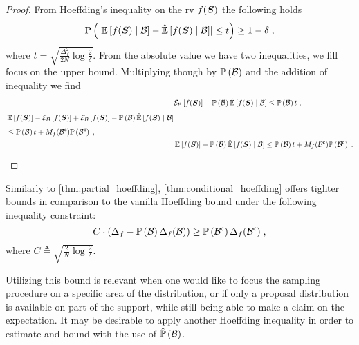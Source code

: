 \begin{proof}
	From Hoeffding's inequality on the \gls{rv} $f(\boldsymbol S)$ the following holds
	\begin{equation*}
		\mathrm{P}\left({\lvert\operatorname*{\mathbb{E}}\limits_{}\left[{f(\boldsymbol S)}\mid{\ensuremath{\mathcal B}}\right]-\operatorname*{\hat{\operatorname*{\mathbb{E}}}}\limits_{}\left[{f(\boldsymbol S)}\mid{\ensuremath{\mathcal B}}\right]\rvert\leq t}\right)\geq1-\delta\;,
	\end{equation*}
	where $t=\sqrt{\frac{\Delta_f^2}{2N}\log\frac{2}{\delta}}$. From the absolute value we have two inequalities, we fill focus on the upper bound.
	Multiplying though by $\mathbb{P}\left({\mathcal B}\right)$ and the addition of inequality  we find
	\begin{align*}
		& \mathcal{E}_{\mathcal B}\left[{f(\boldsymbol S)}\right]-\mathbb{P}\left({\mathcal B}\right)\operatorname*{\hat{\operatorname*{\mathbb{E}}}}\limits_{}\left[{f(\boldsymbol S)}\mid{\ensuremath{\mathcal B}}\right]\leq \mathbb{P}\left({\mathcal B}\right)t\;,\\
		\begin{split}
			& \operatorname*{\mathbb{E}}\limits_{}\left[{f(\boldsymbol S)}\right]-\mathcal{E}_{\mathcal B}\left[{f(\boldsymbol S)}\right]+\mathcal{E}_{\mathcal B}\left[{f(\boldsymbol S)}\right]-\mathbb{P}\left({\mathcal B}\right)\operatorname*{\hat{\operatorname*{\mathbb{E}}}}\limits_{}\left[{f(\boldsymbol S)}\mid{\ensuremath{\mathcal B}}\right] \\
			& \leq \mathbb{P}\left({\mathcal B}\right)t+M_f({\mathcal B}^{\mathsf{c}})\mathbb{P}\left({{\mathcal B}^{\mathsf{c}}}\right)\;,
		\end{split} \\
		& \operatorname*{\mathbb{E}}\limits_{}\left[{f(\boldsymbol S)}\right]-\mathbb{P}\left({\mathcal B}\right)\operatorname*{\hat{\operatorname*{\mathbb{E}}}}\limits_{}\left[{f(\boldsymbol S)}\mid{\ensuremath{\mathcal B}}\right]\leq\mathbb{P}\left({\mathcal B}\right)t+M_f({\mathcal B}^{\mathsf{c}})\mathbb{P}\left({{\mathcal B}^{\mathsf{c}}}\right)\;.
	\end{align*}
\end{proof}

\noindent Similarly to \cref{thm:partial_hoeffding}, \cref{thm:conditional_hoeffding} offers tighter bounds in comparison to the vanilla Hoeffding bound under the following inequality constraint:
\begin{equation}
	C\cdot\left(\Delta_f-\mathbb{P}\left({\mathcal B}\right)\Delta_f(\mathcal B)\right)\geq \mathbb{P}\left({{\mathcal B}^{\mathsf{c}}}\right)\Delta_f({\mathcal B}^{\mathsf{c}})\;,
\end{equation}
where $C\triangleq\sqrt{\frac{2}{N}\log\frac{2}{\delta}}$.

Utilizing this bound is relevant when one would like to focus the sampling procedure on a specific area of the distribution, or if only a proposal distribution is available on part of the support, while still being able to make a claim on the expectation. It may be desirable to apply another Hoeffding inequality in order to estimate and bound with the use of $\hat{\mathbb{P}}\left({\mathcal B}\right)$.

